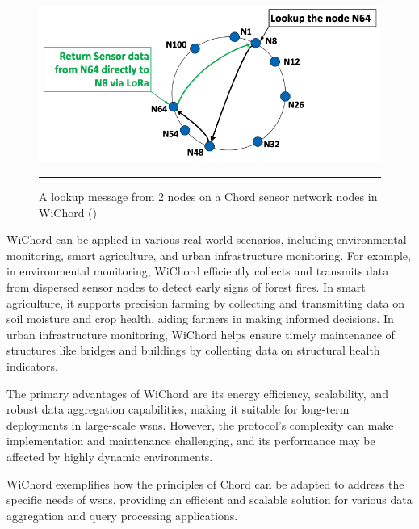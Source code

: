 \begin{figure}[htbp]
    \centering
 \includegraphics[width=.6\textwidth]{figures/chord-lookup-message-from-one-node-to-another.png}
     \rule{35em}{0.5pt}
    \caption{A lookup message from 2 nodes on a Chord sensor network nodes in WiChord (\cite{balatsouras2022wichord})} 
\end{figure}

WiChord can be applied in various real-world scenarios, including environmental monitoring, smart agriculture, and urban infrastructure monitoring.
For example, in environmental monitoring, WiChord efficiently collects and transmits data from dispersed sensor nodes to detect early signs of forest fires.
In smart agriculture, it supports precision farming by collecting and transmitting data on soil moisture and crop health, aiding farmers in making informed decisions.
In urban infrastructure monitoring, WiChord helps ensure timely maintenance of structures like bridges and buildings by collecting data on structural health indicators.

The primary advantages of WiChord are its energy efficiency, scalability, and robust data aggregation capabilities, making it suitable for long-term deployments in large-scale \glspl{wsn}.
However, the protocol's complexity can make implementation and maintenance challenging, and its performance may be affected by highly dynamic environments.

WiChord exemplifies how the principles of Chord can be adapted to address the specific needs of \glspl{wsn}, providing an efficient and scalable solution for various data aggregation and query processing applications.